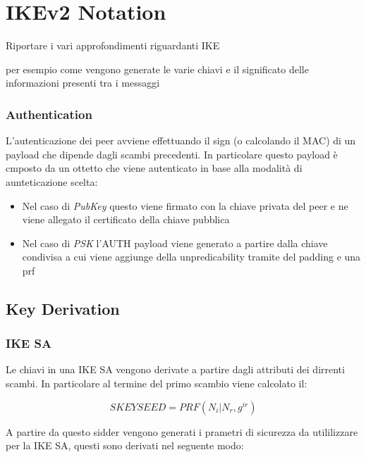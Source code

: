 
\chapter{IKEv2 Notation} %

\label{AppendixA} %

Riportare i vari approfondimenti riguardanti IKE

per esempio come vengono generate le varie chiavi e il significato delle informazioni presenti tra i messaggi


\subsection{Authentication}

L'autenticazione dei peer avviene effettuando il sign (o calcolando il MAC) di un payload che dipende dagli scambi precedenti.
In particolare questo payload è cmposto da un ottetto che viene autenticato in base alla modalità di aunteticazione scelta:

\begin{itemize}
    \item Nel caso di \textit{PubKey} questo viene firmato con la chiave privata del peer e ne viene allegato il certificato della chiave pubblica 
    \item Nel caso di \textit{PSK} l'AUTH payload viene generato a partire dalla chiave condivisa a cui viene aggiunge della unpredicability tramite del padding e una prf
\end{itemize}

\section{Key Derivation}

\subsection{IKE SA}

Le chiavi in una IKE SA vengono derivate a partire dagli attributi dei dirrenti scambi.
In particolare al termine del primo scambio viene calcolato il:

$$SKEYSEED=PRF(N_i|N_r,g^{ir})$$

A partire da questo sidder vengono generati i prametri di sicurezza da utililizzare per la IKE SA, questi sono derivati nel seguente modo:

